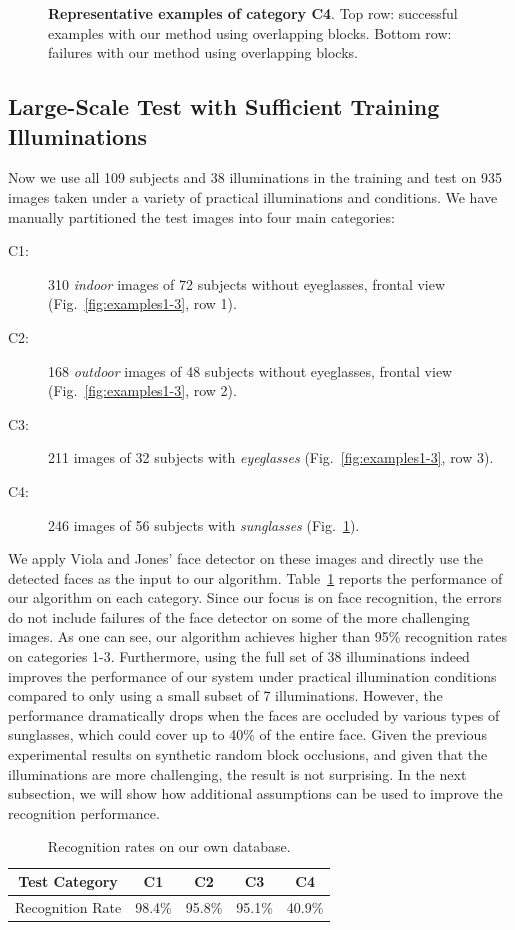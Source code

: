 \begin{figure}[t]
\begin{tabular}{@{}c@{}c@{}c@{}c@{}c@{}c@{}}
\end{tabular}
 \caption{\small{\bf Representative examples of category C4}. Top row: successful examples with our method using overlapping blocks. Bottom row: failures with our method using overlapping blocks.}\label{fig:examples4}
\end{figure}

\subsection{Large-Scale Test with Sufficient Training
Illuminations} Now we use all 109 subjects and 38 illuminations
in the training and test on 935 images taken under a variety of
practical illuminations and conditions. We have manually partitioned the test images into four main
categories:
\begin{description}
\item[C1:] 310 \emph{indoor} images of 72 subjects without
    eyeglasses, frontal view
    (Fig.~\ref{fig:examples1-3}, row 1).
\item[C2:] 168 \emph{outdoor} images of 48 subjects without
    eyeglasses, frontal view
    (Fig.~\ref{fig:examples1-3}, row 2).
\item[C3:] 211 images of 32 subjects with \emph{eyeglasses}
    (Fig.~\ref{fig:examples1-3}, row 3).
\item[C4:] 246 images of 56 subjects with \emph{sunglasses}
    (Fig.~\ref{fig:examples4}).
\end{description}
We apply Viola and Jones' face detector on these images and
directly use the detected faces as the input to our algorithm.
Table~\ref{tab:UIUC-recognition} reports the performance of our
algorithm on each category.
Since our focus is on face
recognition, the errors do not include failures of the face
detector on some of the more challenging images.
As one can see, our algorithm achieves higher than 95\%
recognition rates on categories 1-3. Furthermore, using the
full set of 38 illuminations indeed improves the performance of
our system under practical illumination conditions compared to
only using a small subset of 7 illuminations. However, the
performance dramatically drops when the faces are occluded by
various types of sunglasses, which could cover up to 40\% of
the entire face. Given the previous experimental results on
synthetic random block occlusions, and given that the
illuminations are more challenging, the result is not
surprising. In the next subsection, we will show how additional
assumptions can be used to improve the recognition performance.
\begin{table}[h]
\centering \caption{Recognition rates on our own
database.}
\begin{tabular}{|c|c|c|c|c| }
\hline
Test Category & C1 & C2 & C3 & C4  \\
\hline
\hline
Recognition Rate & 98.4\% & 95.8\% & 95.1\% & 40.9\% \\
\hline
\end{tabular}
\label{tab:UIUC-recognition}
\end{table}

